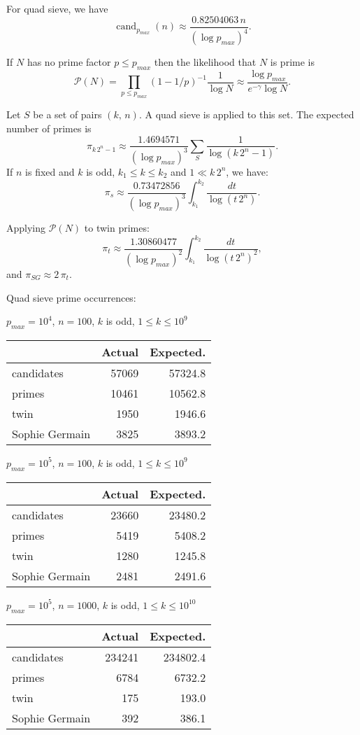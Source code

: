 \documentclass[a4paper, 12pt]{article}
\DeclareMathOperator{\cand}{cand}
\newcommand\T{\rule{0pt}{2.6ex}}
\theoremstyle{plain}
\theoremstyle{definition}
\begin{document}
For quad sieve, we have
\[\cand_{p_{max}}(n) \approx \frac{0.82504063\, n}{\left(\log p_{max}\right)^4}.\]

\medskip
 
If $N$ has no prime factor $p \leq p_{max}$ then the likelihood that $N$ is prime is
\[\mathcal{P}(N) = \prod_{p \leq p_{max}} \left(1 - 1/p\right)^{-1} \frac{1}{\log N}
 \approx \frac{\log p_{max}}{e^{-\gamma} \log N}.\]

Let $S$ be a set of pairs $(k,\, n)$. A quad sieve is applied to this set. The expected
number of primes is
\[\pi_{k\,2^n - 1} \approx \frac{1.4694571}{\left(\log p_{max}\right)^3}
 \sum_S \frac{1}{\log(k\,2^n - 1)} .\]
If $n$ is fixed and $k$ is odd, $k_1 \leq k \leq k_2$ and $1 \ll k\,2^n$, we have:
\[\pi_s \approx \frac{0.73472856}{\left(\log p_{max}\right)^3}
 \int_{k_1}^{k_2} \frac{dt}{\log(t\,2^n)}.\]

Applying $\mathcal{P}(N)$ to twin primes:
\[\pi_t \approx \frac{1.30860477}{\left(\log p_{max}\right)^2}
 \int_{k_1}^{k_2} \frac{dt}{\log(t\,2^n)^2},\]
 and $\pi_{SG} \approx 2\,\pi_t$.

\begin{center}
Quad sieve prime occurrences:\\
\bigskip

$p_{max} = 10^4$, $n = 100$, $k$ is odd, $1 \leq k \leq 10^9$
\smallskip

\begin{tabular}{lrr}
 & Actual & Expected.\\
\hline \T
candidates & 57069 & 57324.8\\
primes & 10461 & 10562.8\\
twin & 1950 & 1946.6\\
Sophie Germain & 3825 & 3893.2
\end{tabular}
\bigskip

$p_{max} = 10^5$, $n = 100$, $k$ is odd, $1 \leq k \leq 10^9$
\smallskip

\begin{tabular}{lrr}
 & Actual & Expected.\\
\hline \T
candidates & 23660 & 23480.2\\
primes & 5419 & 5408.2\\
twin & 1280 & 1245.8\\
Sophie Germain & 2481 & 2491.6
\end{tabular}
\bigskip

$p_{max} = 10^5$, $n = 1000$, $k$ is odd, $1 \leq k \leq 10^{10}$
\smallskip

\begin{tabular}{lrr}
 & Actual & Expected.\\
\hline \T
candidates & 234241 & 234802.4\\
primes & 6784 & 6732.2\\
twin & 175 & 193.0\\
Sophie Germain &392 & 386.1
\end{tabular}
\bigskip

\end{center}
\end{document}
